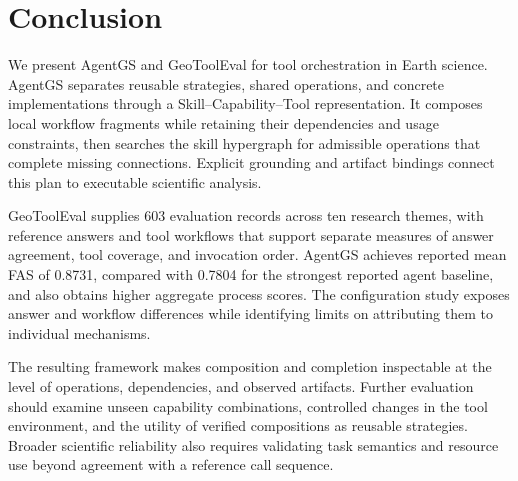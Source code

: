 \section{Conclusion}
\label{sec:conclusion}
We present AgentGS and GeoToolEval for tool orchestration in Earth science. AgentGS separates reusable strategies, shared operations, and concrete implementations through a Skill--Capability--Tool representation. It composes local workflow fragments while retaining their dependencies and usage constraints, then searches the skill hypergraph for admissible operations that complete missing connections. Explicit grounding and artifact bindings connect this plan to executable scientific analysis.

GeoToolEval supplies 603 evaluation records across ten research themes, with reference answers and tool workflows that support separate measures of answer agreement, tool coverage, and invocation order. AgentGS achieves reported mean FAS of 0.8731, compared with 0.7804 for the strongest reported agent baseline, and also obtains higher aggregate process scores. The configuration study exposes answer and workflow differences while identifying limits on attributing them to individual mechanisms.

The resulting framework makes composition and completion inspectable at the level of operations, dependencies, and observed artifacts. Further evaluation should examine unseen capability combinations, controlled changes in the tool environment, and the utility of verified compositions as reusable strategies. Broader scientific reliability also requires validating task semantics and resource use beyond agreement with a reference call sequence.
